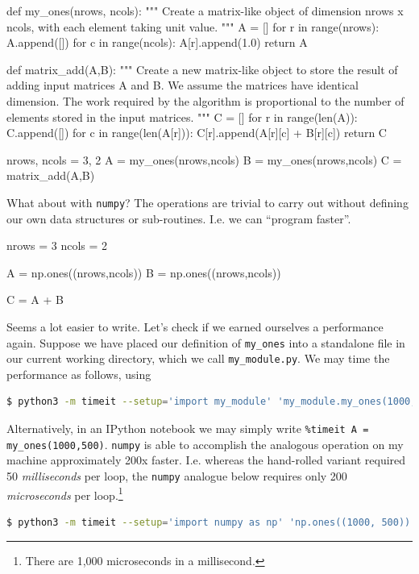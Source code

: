 \documentclass[12pt,letterpaper,twoside]{article}
\begin{document}
\begin{python}
def my_ones(nrows, ncols):
    """
    Create a matrix-like object of dimension nrows x ncols, with each
    element taking unit value.
    """
    A = []
    for r in range(nrows):
        A.append([])
        for c in range(ncols):
            A[r].append(1.0)
    return A

def matrix_add(A,B):
    """
    Create a new matrix-like object to store the result of adding
    input matrices A and B. We assume the matrices have identical
    dimension. The work required by the algorithm is proportional to
    the number of elements stored in the input matrices.
    """
    C = []
    for r in range(len(A)):
        C.append([])
        for c in range(len(A[r])):
            C[r].append(A[r][c] + B[r][c])
    return C

nrows, ncols = 3, 2
A = my_ones(nrows,ncols)
B = my_ones(nrows,ncols)
C = matrix_add(A,B)
\end{python}

What about with \texttt{numpy}? The operations are trivial to carry
out without defining our own data structures or sub-routines.
I.e. we can ``program faster''.

\begin{python}
nrows = 3
ncols = 2

A = np.ones((nrows,ncols))
B = np.ones((nrows,ncols))

C = A + B
\end{python}

Seems a lot easier to write. Let's check if we earned ourselves a performance again.
Suppose we have placed our definition of \texttt{my\_ones} into a
standalone file in our current working directory, which we call
\texttt{my\_module.py}. We may time the performance as
follows, using
\begin{lstlisting}[language=bash,basicstyle=\small]
  $ python3 -m timeit --setup='import my_module' 'my_module.my_ones(1000, 500)'
\end{lstlisting}

Alternatively, in an IPython notebook we may simply
write \texttt{\%timeit A = my\_ones(1000,500)}.
\texttt{numpy} is able to accomplish the analogous operation on my
machine approximately 200x faster. I.e. whereas the hand-rolled variant required
50 \emph{milliseconds} per loop, the \texttt{numpy} analogue below
requires only 200 \emph{microseconds} per loop.\footnote{There are 1,000
microseconds in a millisecond.}

\begin{lstlisting}[language=bash,basicstyle=\small]
  $ python3 -m timeit --setup='import numpy as np' 'np.ones((1000, 500))'
\end{lstlisting}
\end{document}
